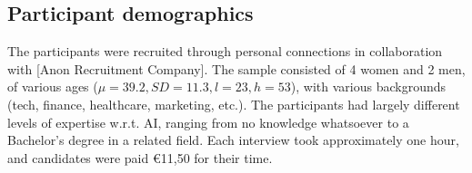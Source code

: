 \subsection{Participant demographics}
The participants were recruited through personal connections in collaboration with [Anon Recruitment Company]. The sample consisted of 4 women and 2 men, of various ages ($\mu = 39.2, SD = 11.3, l=23, h=53$), with various backgrounds (tech, finance, healthcare, marketing, etc.). The participants had largely different levels of expertise w.r.t. AI, ranging from no knowledge whatsoever to a Bachelor's degree in a related field. Each interview took approximately one hour, and candidates were paid \euro{11,50} for their time. 
